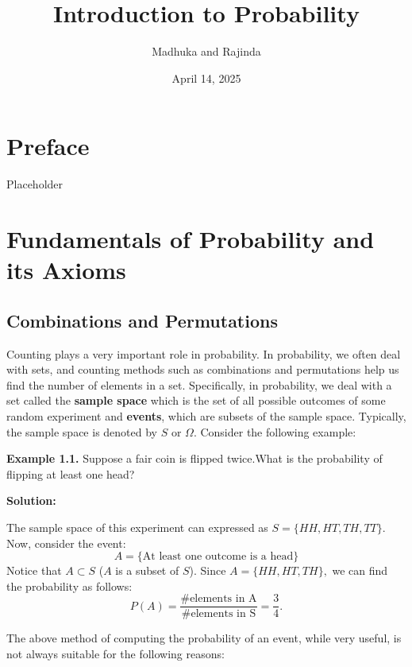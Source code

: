 \documentclass[
  12pt,
]{krantzNoCorner}
\title{Introduction to Probability}
\author{Madhuka and Rajinda}
\date{April 14, 2025}
\begin{document}
\maketitle

{
\hypersetup{linkcolor=}
\setcounter{tocdepth}{2}
\tableofcontents
}
\hypertarget{preface}{%
\chapter*{Preface}\label{preface}}


Placeholder

\hypertarget{fundamentals-of-probability-and-its-axioms}{%
\chapter{Fundamentals of Probability and its Axioms}\label{fundamentals-of-probability-and-its-axioms}}

\hypertarget{combinations-and-permutations}{%
\section{Combinations and Permutations}\label{combinations-and-permutations}}

Counting plays a very important role in probability. In probability, we
often deal with sets, and counting methods such as combinations and
permutations help us find the number of elements in a set. Specifically,
in probability, we deal with a set called the \textbf{sample space} which is
the set of all possible outcomes of some random experiment and
\textbf{events}, which are subsets of the sample space. Typically, the sample
space is denoted by \(S\) or \(\Omega.\) Consider the following example:

\textbf{Example 1.1.} Suppose a fair coin is flipped twice.What is the
probability of flipping at least one head?

\textbf{Solution:}

The sample space of this experiment can expressed as
\(S=\{HH,HT,TH,TT\}\). Now, consider the event:
\[A=\{\text{At least one outcome is a head}\}\] Notice that \(A\subset S\)
(\(A\) is a subset of \(S\)). Since \(A=\{HH,HT,TH\},\) we can find the
probability as follows:
\[P(A)= \frac{\#\text{elements in A}}{\#\text{elements in S}}=\frac{3}{4}.\]

The above method of computing the probability of an event, while very
useful, is not always suitable for the following reasons:
\end{document}
